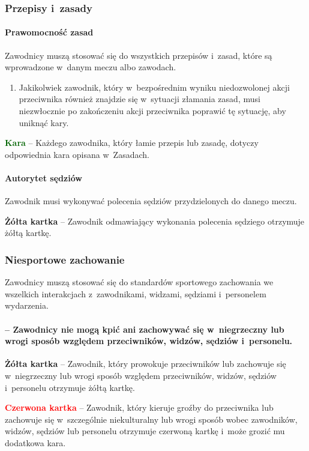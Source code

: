 \documentclass[12pt,a4paper]{article}
\newcommand\redcard[1]{\bgroup\textcolor{red}{\textbf{#1}}}
\newcommand\yellowcard[1]{\bgroup\textcolor{darkyellow}{\textbf{#1}}}
\newcommand\other[1]{\bgroup\textcolor{darkgreen}{\textbf{#1}}}
\begin{document}
\subsubsection{Przepisy i~zasady}

\paragraph{Prawomocność zasad}
Zawodnicy muszą stosować się do
wszystkich przepisów i~zasad, które są wprowadzone w~danym meczu albo
zawodach.
\begin{enumerate}
	\item Jakikolwiek zawodnik, który w~bezpośrednim wyniku niedozwolonej akcji
	      przeciwnika również znajdzie się w~sytuacji złamania zasad, musi
	      niezwłocznie po zakończeniu akcji przeciwnika poprawić tę sytuację, aby
	      uniknąć kary.
\end{enumerate}

\other{Kara} -- Każdego zawodnika, który łamie przepis lub zasadę, dotyczy
odpowiednia kara opisana w~Zasadach.

\paragraph{Autorytet sędziów}
Zawodnik musi wykonywać polecenia
sędziów przydzielonych do danego meczu.

\yellowcard{Żółta kartka} -- Zawodnik odmawiający wykonania polecenia sędziego
otrzymuje żółtą kartkę.

\subsubsection{Niesportowe zachowanie}

Zawodnicy muszą stosować się do standardów sportowego zachowania we
wszelkich interakcjach z~zawodnikami, widzami, sędziami i~personelem
wydarzenia.

\paragraph{-- Zawodnicy nie mogą kpić ani zachowywać się w~niegrzeczny lub wrogi sposób względem przeciwników, widzów, sędziów i~personelu.}

\yellowcard{Żółta kartka} -- Zawodnik, który prowokuje przeciwników lub zachowuje się w~niegrzeczny
lub wrogi sposób względem przeciwników, widzów, sędziów i~personelu
otrzymuje żółtą kartkę.

\redcard{Czerwona kartka} -- Zawodnik, który kieruje groźby do przeciwnika lub zachowuje się w~szczególnie niekulturalny lub wrogi
sposób wobec zawodników, widzów, sędziów lub personelu otrzymuje
czerwoną kartkę i~może grozić mu dodatkowa kara.
\end{document}
